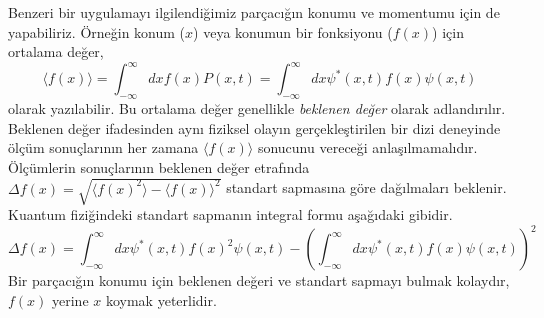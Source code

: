 \documentclass[a4paper,12pt, twoside]{article}
\begin{document}
Benzeri bir uygulamayı ilgilendiğimiz parçacığın konumu ve momentumu için de yapabiliriz. Örneğin konum ($x$) veya konumun bir fonksiyonu ($f(x)$) için ortalama değer,
\begin{equation}
\langle f(x) \rangle =\int ^{\infty }_{-\infty }dx f(x) P\left( x,t\right) =\int ^{\infty }_{-\infty }dx \psi^{\ast }\left(x,t\right) f(x) \psi \left( x,t\right)
\label{eq:expactation_value}
\end{equation}
olarak yazılabilir. Bu ortalama değer genellikle \emph{beklenen değer} olarak adlandırılır. Beklenen değer ifadesinden aynı fiziksel olayın gerçekleştirilen bir dizi deneyinde ölçüm sonuçlarının her zamana $\langle f(x) \rangle$ sonucunu vereceği anlaşılmamalıdır. Ölçümlerin sonuçlarının beklenen değer etrafında $\Delta f(x) = \sqrt{\langle f(x)^2 \rangle - \langle f(x) \rangle^2}$ standart sapmasına göre dağılmaları beklenir. Kuantum fiziğindeki standart sapmanın integral formu aşağıdaki gibidir.
\begin{equation}
\Delta f(x) = \int ^{\infty }_{-\infty }dx \psi^{\ast }\left(x,t\right) f(x)^2 \psi \left( x,t\right) -\left( \int ^{\infty }_{-\infty }dx \psi^{\ast }\left(x,t\right) f(x) \psi \left( x,t\right)\right)^2
\end{equation}
Bir parçacığın konumu için beklenen değeri ve standart sapmayı bulmak kolaydır, $f(x)$ yerine $x$ koymak yeterlidir. 
\end{document}
